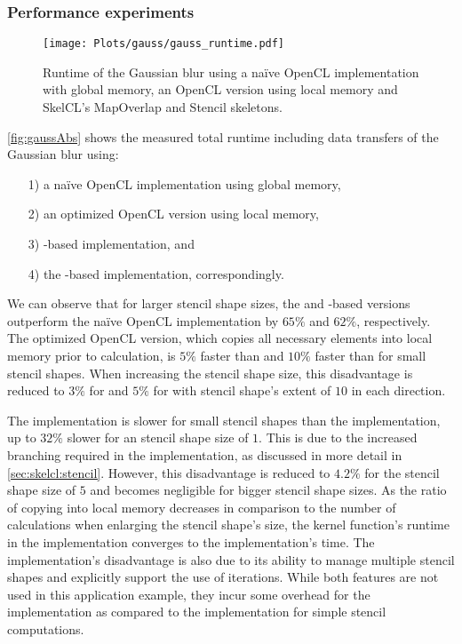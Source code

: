 \subsubsection*{Performance experiments}

\begin{figure}[tbp]
	\centering
	\texttt{[image: Plots/gauss/gauss\_runtime.pdf]}
	\caption[Runtime of the Gaussian blur using different implementations.]%
          {Runtime of the Gaussian blur using a na{\"i}ve OpenCL implementation with global memory, an OpenCL version using local memory and SkelCL's MapOverlap and Stencil skeletons.}
	\label{fig:gaussAbs}
\end{figure} 

\autoref{fig:gaussAbs} shows the measured total runtime including data transfers of the Gaussian blur using:
\begin{itemize}
  \item[1)] a na{\"i}ve OpenCL implementation using global memory,
  \item[2)] an optimized OpenCL version using local memory,
  \item[3)] -based implementation, and
  \item[4)] the -based implementation, correspondingly.
\end{itemize}
We can observe that for larger stencil shape sizes, the  and -based versions outperform the na{\"i}ve OpenCL implementation by $65\%$ and $62\%$, respectively.
The optimized OpenCL version, which copies all necessary elements into local memory prior to calculation, is $5\%$ faster than  and $10\%$ faster than  for small stencil shapes.
When increasing the stencil shape size, this disadvantage is reduced to $3\%$ for  and $5\%$ for  with stencil shape's extent of $10$ in each direction.

The  implementation is slower for small stencil shapes than the  implementation, up to $32\%$ slower for an stencil shape size of $1$.
This is due to the increased branching required in the  implementation, as discussed in more detail in \autoref{sec:skelcl:stencil}.
However, this disadvantage is reduced to $4.2\%$ for the stencil shape size of $5$ and becomes negligible for bigger stencil shape sizes.
As the ratio of copying into local memory decreases in comparison to the number of calculations when enlarging the stencil shape's size, the kernel function's runtime in the  implementation  converges to the  implementation's time.
The  implementation's disadvantage is also due to its ability to manage multiple stencil shapes and explicitly support the use of iterations.
While both features are not used in this application example, they incur some overhead for the implementation as compared to the  implementation for simple stencil computations.


